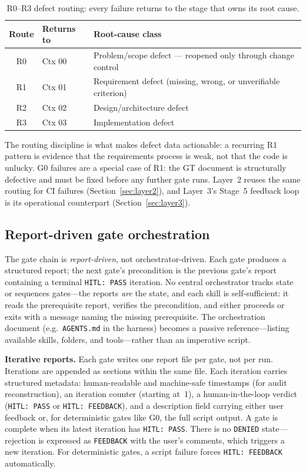 \documentclass[11pt,a4paper]{article}
\begin{document}
\begin{table}[htbp]
\centering
\caption{R0--R3 defect routing: every failure returns to the stage that owns its root cause.}
\label{tab:routing}
\small
\begin{tabular}{@{}clp{7.4cm}@{}}
\toprule
\textbf{Route} & \textbf{Returns to} & \textbf{Root-cause class} \\
\midrule
R0 & Ctx 00 & Problem/scope defect --- reopened only through change control \\
R1 & Ctx 01 & Requirement defect (missing, wrong, or unverifiable criterion) \\
R2 & Ctx 02 & Design/architecture defect \\
R3 & Ctx 03 & Implementation defect \\
\bottomrule
\end{tabular}
\end{table}

The routing discipline is what makes defect data actionable: a recurring R1 pattern is evidence
that the requirements process is weak, not that the code is unlucky. G0 failures are a special
case of R1: the GT document is structurally defective and must be fixed before any further gate
runs. Layer~2 reuses the same routing for CI failures (Section~\ref{sec:layer2}), and Layer~3's
Stage~5 feedback loop is its operational counterpart (Section~\ref{sec:layer3}).

\subsection{Report-driven gate orchestration}
\label{sec:reports}

The gate chain is \emph{report-driven}, not orchestrator-driven. Each gate produces a
structured report; the next gate's precondition is the previous gate's report containing a
terminal \texttt{HITL: PASS} iteration. No central orchestrator tracks state or sequences
gates---the reports \emph{are} the state, and each skill is self-sufficient: it reads the
prerequisite report, verifies the precondition, and either proceeds or exits with a message
naming the missing prerequisite. The orchestration document (e.g.\ \texttt{AGENTS.md} in
the harness) becomes a passive reference---listing available skills, folders, and
tools---rather than an imperative script.

\textbf{Iterative reports.} Each gate writes one report file per gate, not per run.
Iterations are appended as sections within the same file. Each iteration carries structured
metadata: human-readable and machine-safe timestamps (for audit reconstruction), an
iteration counter (starting at~1), a human-in-the-loop verdict (\texttt{HITL: PASS} or
\texttt{HITL: FEEDBACK}), and a description field carrying either user feedback or, for
deterministic gates like G0, the full script output. A gate is complete when its latest
iteration has \texttt{HITL: PASS}. There is no \texttt{DENIED} state---rejection is
expressed as \texttt{FEEDBACK} with the user's comments, which triggers a new iteration.
For deterministic gates, a script failure forces \texttt{HITL: FEEDBACK} automatically.
\end{document}

